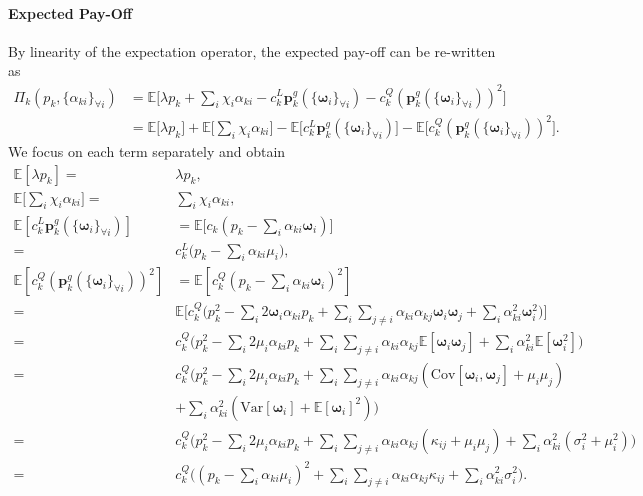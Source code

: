 \documentclass{article}
\begin{document}
\paragraph{Expected Pay-Off} By linearity of the expectation operator, the expected pay-off can be re-written as
\begin{align*}
\Pi_k(p_k, \{\alpha_{ki}\}_{\forall i}) &= \mathbb{E}\Big[\lambda p_k + \sum_i \chi_i \alpha_{ki} - c_k^L \mathbf{p}_k^g(\{\boldsymbol{\omega}_i\}_{\forall i}) - c_k^Q (\mathbf{p}_k^g(\{\boldsymbol{\omega}_i\}_{\forall i}))^2\Big]\\
&= \mathbb{E}\big[\lambda p_k\big] + \mathbb{E}\Big[\sum_i \chi_i \alpha_{ki}\Big] - \mathbb{E}\big[c_k^L \mathbf{p}_k^g(\{\boldsymbol{\omega}_i\}_{\forall i})\big] - \mathbb{E}\big[c_k^Q (\mathbf{p}_k^g(\{\boldsymbol{\omega}_i\}_{\forall i}))^2\big].
\end{align*}
We focus on each term separately and obtain
\begin{align*}
\mathbb{E}[\lambda p_k] =& \lambda p_k,\\
\mathbb{E}\Big[\sum_i \chi_i \alpha_{ki}\Big] =& \sum_i \chi_i \alpha_{ki},\\
\mathbb{E}[c_k^L \mathbf{p}_k^g(\{\boldsymbol{\omega}_i\}_{\forall i})] &= \mathbb{E}\Big[c_k (p_k - \sum_i \alpha_{ki} \boldsymbol{\omega}_i)\Big]\\
=& c_k^L\Big(p_k - \sum_i \alpha_{ki} \mu_i\Big),\\
\mathbb{E}[c_k^Q (\mathbf{p}_k^g(\{\boldsymbol{\omega}_i\}_{\forall i}))^2] &= \mathbb{E}[c_k^Q (p_k - \sum_i \alpha_{ki} \boldsymbol{\omega}_i)^2]\\
=& \mathbb{E}\Big[c_k^Q \big(p_k^2 - \sum_i 2 \boldsymbol{\omega}_i \alpha_{ki} p_k + \sum_i \sum_{j \ne i} \alpha_{ki} \alpha_{kj}  \boldsymbol{\omega}_i  \boldsymbol{\omega}_j + \sum_i \alpha_{ki}^2 \boldsymbol{\omega}_i^2\big)\Big]\\
=& c_k^Q \Big(p_k^2 - \sum_i 2\mu_i \alpha_{ki} p_k + \sum_i \sum_{j \ne i} \alpha_{ki} \alpha_{kj}  \mathbb{E}[\boldsymbol{\omega}_i  \boldsymbol{\omega}_j] + \sum_i \alpha_{ki}^2 \mathbb{E}[\boldsymbol{\omega}_i^2]\Big)\\
=& c_k^Q \Big(p_k^2 - \sum_i 2\mu_i \alpha_{ki} p_k + \sum_i \sum_{j \ne i} \alpha_{ki} \alpha_{kj}  (\mbox{Cov}[\boldsymbol{\omega}_i, \boldsymbol{\omega}_j] + \mu_i \mu_j)\\
 &+ \sum_i \alpha_{ki}^2 (\mbox{Var}[\boldsymbol{\omega}_i] + \mathbb{E}[\boldsymbol{\omega}_i]^2)\Big)\\
=& c_k^Q \Big(p_k^2 - \sum_i 2\mu_i \alpha_{ki} p_k + \sum_i \sum_{j \ne i} \alpha_{ki} \alpha_{kj}  (\kappa_{ij} + \mu_i \mu_j) + \sum_i \alpha_{ki}^2 (\sigma_i^2 + \mu_i^2)\Big)\\
=& c_k^Q \Big((p_k - \sum_i \alpha_{ki} \mu_i)^2 + \sum_i \sum_{j \ne i} \alpha_{ki} \alpha_{kj}  \kappa_{ij} + \sum_i \alpha_{ki}^2 \sigma_i^2 \Big).
\end{align*}
\end{document}
